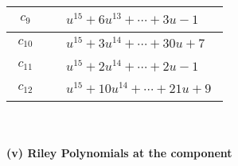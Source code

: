 \documentclass[1p]{elsarticle_modified}
\theoremstyle{definition}
\begin{document}
\begin{tabular}{m{50pt}|m{274pt}}
\hline $$\begin{aligned}c_{9}\end{aligned}$$&$\begin{aligned}
&u^{15}+6 u^{13}+\cdots+3 u-1
\end{aligned}$\\
\hline $$\begin{aligned}c_{10}\end{aligned}$$&$\begin{aligned}
&u^{15}+3 u^{14}+\cdots+30 u+7
\end{aligned}$\\
\hline $$\begin{aligned}c_{11}\end{aligned}$$&$\begin{aligned}
&u^{15}+2 u^{14}+\cdots+2 u-1
\end{aligned}$\\
\hline $$\begin{aligned}c_{12}\end{aligned}$$&$\begin{aligned}
&u^{15}+10 u^{14}+\cdots+21 u+9
\end{aligned}$\\
\hline
\end{tabular}\\~\\
\newpage\renewcommand{\arraystretch}{1}
\flushleft \textbf{(v) Riley Polynomials at the component}\newline \\
\end{document}
